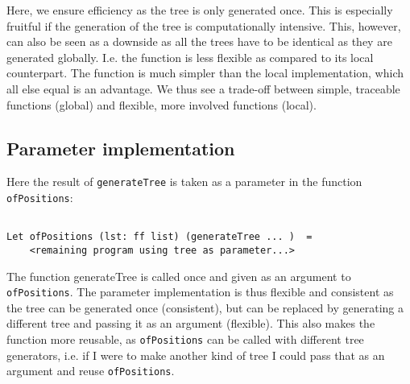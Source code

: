 \documentclass[a4paper]{article}
\begin{document}
\noindent
Here, we ensure efficiency as the tree is only generated once. This is especially fruitful if the generation of the tree is computationally intensive. This, however, can also be seen as a downside as all the trees have to be identical as they are generated globally. I.e. the function is less flexible as compared to its local counterpart. The function is much simpler than the local implementation, which all else equal is an advantage. We thus see a trade-off between simple, traceable functions (global) and flexible, more involved functions (local).

\subsection*{Parameter implementation}

Here the result of \verb|generateTree| is taken as a parameter in the function \verb|ofPositions|:

\begin{lstlisting}

Let ofPositions (lst: ff list) (generateTree ... )  =
    <remaining program using tree as parameter...>
\end{lstlisting}

\noindent
The function generateTree is called once and given as an argument to \verb|ofPositions|. The parameter implementation is thus flexible and consistent as the tree can be generated once (consistent), but can be replaced by generating a different tree and passing it as an argument (flexible). This also makes the function more reusable, as \verb|ofPositions| can be called with different tree generators, i.e. if I were to make another kind of tree I could pass that as an argument and reuse \verb|ofPositions|. 
\end{document}
